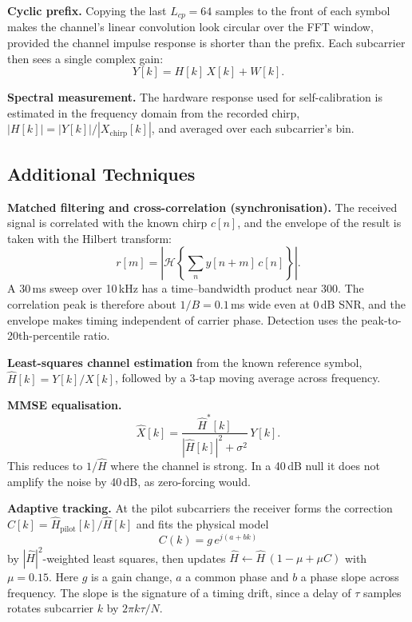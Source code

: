 \documentclass[11pt,a4paper]{report}
\begin{document}
\textbf{Cyclic prefix.} Copying the last $L_{cp}=64$ samples to the front of each
symbol makes the channel's linear convolution look circular over the FFT window,
provided the channel impulse response is shorter than the prefix. Each subcarrier
then sees a single complex gain:
\begin{equation}
Y[k] = H[k]\,X[k] + W[k].
\end{equation}

\textbf{Spectral measurement.} The hardware response used for self-calibration is
estimated in the frequency domain from the recorded chirp,
$|H[k]| = |Y[k]|/|X_{\text{chirp}}[k]|$, and averaged over each subcarrier's bin.

\subsection{Additional Techniques}

\textbf{Matched filtering and cross-correlation (synchronisation).} The received
signal is correlated with the known chirp $c[n]$, and the envelope of the result is
taken with the Hilbert transform:
\begin{equation}
r[m] = \left|\mathcal{H}\left\{\sum_n y[n+m]\,c[n]\right\}\right| .
\end{equation}
A 30\,ms sweep over 10\,kHz has a time--bandwidth product near 300. The correlation
peak is therefore about $1/B=0.1$\,ms wide even at 0\,dB SNR, and the envelope makes
timing independent of carrier phase. Detection uses the peak-to-20th-percentile
ratio.

\textbf{Least-squares channel estimation} from the known reference symbol,
$\hat H[k]=Y[k]/X[k]$, followed by a 3-tap moving average across frequency.

\label{sec:mmse}\textbf{MMSE equalisation.}
\begin{equation}
\hat X[k] = \frac{\hat H^*[k]}{|\hat H[k]|^2+\sigma^2}\,Y[k].
\end{equation}
This reduces to $1/\hat H$ where the channel is strong. In a 40\,dB null it does not
amplify the noise by 40\,dB, as zero-forcing would.

\textbf{Adaptive tracking.} At the pilot subcarriers the receiver forms the
correction $C[k]=\hat H_{\text{pilot}}[k]/\hat H[k]$ and fits the physical model
\begin{equation}
C(k) = g\,e^{j(a+bk)}
\end{equation}
by $|\hat H|^2$-weighted least squares, then updates
$\hat H\leftarrow \hat H\,(1-\mu+\mu C)$ with $\mu=0.15$. Here $g$ is a gain change,
$a$ a common phase and $b$ a phase slope across frequency. The slope is the
signature of a timing drift, since a delay of $\tau$ samples rotates subcarrier $k$
by $2\pi k\tau/N$.
\end{document}

